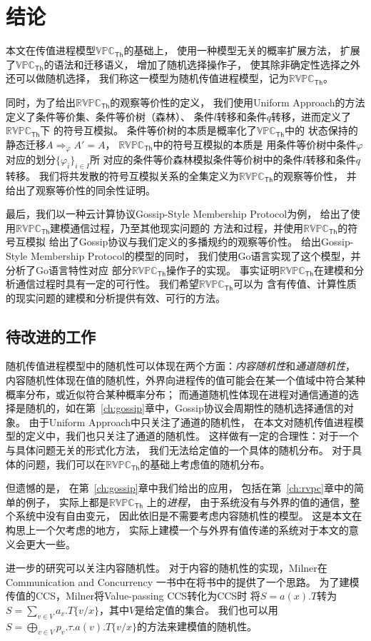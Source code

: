 \chapter{结论}

本文在传值进程模型$\mathbb{VPC}_{\mathsf{Th}}$的基础上，
使用一种模型无关的概率扩展方法，
扩展了$\mathbb{VPC}_{\mathsf{Th}}$的语法和迁移语义，
增加了随机选择操作子，
使其除非确定性选择之外还可以做随机选择，
我们称这一模型为随机传值进程模型，记为$\mathbb{RVPC}_{\mathsf{Th}}$。

同时，为了给出$\mathbb{RVPC}_{\mathsf{Th}}$的观察等价性的定义，
我们使用Uniform Approach的方法定义了条件等价集、条件等价树（森林）、
条件$l$转移和条件$q$转移，进而定义了$\mathbb{RVPC}_{\mathsf{Th}}$下
的符号互模拟。
条件等价树的本质是概率化了$\mathbb{VPC}_{\mathsf{Th}}$中的
状态保持的静态迁移$A\Rightarrow_{\varphi}A'=A$，
$\mathbb{RVPC}_{\mathsf{Th}}$中的符号互模拟的本质是
用条件等价树中条件$\varphi$对应的划分$\{\varphi_i\}_{i\in I}$所
对应的条件等价森林模拟条件等价树中的条件$l$转移和条件$q$转移。
我们将共发散的符号互模拟关系的全集定义为$\mathbb{RVPC}_{\mathsf{Th}}$的观察等价性，
并给出了观察等价性的同余性证明。

最后，我们以一种云计算协议Gossip-Style Membership Protocol为例，
给出了使用$\mathbb{RVPC}_{\mathsf{Th}}$建模通信过程，乃至其他现实问题的
方法和过程，并使用$\mathbb{RVPC}_{\mathsf{Th}}$的符号互模拟
给出了Gossip协议与我们定义的多播规约的观察等价性。
给出Gossip-Style Membership Protocol的模型的同时，
我们使用Go语言实现了这个模型，并分析了Go语言特性对应
部分$\mathbb{RVPC}_{\mathsf{Th}}$操作子的实现。
事实证明$\mathbb{RVPC}_{\mathsf{Th}}$在建模和分析通信过程时具有一定的可行性。
我们希望$\mathbb{RVPC}_{\mathsf{Th}}$可以为
含有传值、计算性质的现实问题的建模和分析提供有效、可行的方法。

\section{待改进的工作}
随机传值进程模型中的随机性可以体现在两个方面：\textit{内容随机性}和\textit{通道随机性}，
内容随机性体现在值的随机性，外界向进程传的值可能会在某一个值域中符合某种概率分布，或近似符合某种概率分布；
而通道随机性体现在进程对通信通道的选择是随机的，如在第~\ref{ch:gossip}章中，Gossip协议会周期性的随机选择通信的对象。
由于Uniform Approach中只关注了通道的随机性，
在本文对随机传值进程模型的定义中，我们也只关注了通道的随机性。
这样做有一定的合理性：对于一个与具体问题无关的形式化方法，
我们无法给定值的一个具体的随机分布。
对于具体的问题，我们可以在$\mathbb{RVPC}_{\mathsf{Th}}$的基础上考虑值的随机分布。

但遗憾的是，
在第~\ref{ch:gossip}章中我们给出的应用，
包括在第~\ref{ch:rvpc}章中的简单的例子，
实际上都是$\mathbb{RVPC}_{\mathsf{Th}}$
上的\textit{进程}，
由于系统没有与外界的值的通信，整个系统中没有自由变元，
因此依旧是不需要考虑内容随机性的模型。
这是本文在构思上一个欠考虑的地方，
实际上建模一个与外界有值传递的系统对于本文的意义会更大一些。

进一步的研究可以关注内容随机性。
对于内容的随机性的实现，Milner在Communication and Concurrency
一书中在将书中的提供了一个思路。
为了建模传值的CCS，Milner将Value-passing CCS转化为CCS时
将$S=a(x).T$转为$S=\sum_{v\in V} a_v.T\{v/x\}$，其中$V$是给定值的集合。
我们也可以用$S=\bigoplus_{v\in V}p_v.\tau.a(v).T\{v/x\}$的方法来建模值的随机性。
